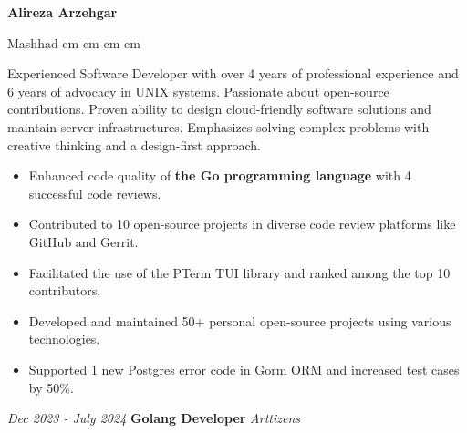 \documentclass{engineercv}
\begin{document}
\begin{center}
  \textbf{\fontsize{24 pt}{24 pt}\selectfont Alireza Arzehgar}

  \vspace{0.2 cm}

  \scriptsize
  \mbox{{\color{black}\footnotesize\faMapMarker*}\hspace*{0.13cm}Mashhad}
   cm
  \mbox{}
   cm
  \mbox{}
   cm
  \mbox{}
   cm
  \mbox{}
\end{center}


Experienced Software Developer with over 4 years of professional experience and 6 years of advocacy in UNIX systems.
Passionate about open-source contributions. Proven ability to design cloud-friendly software solutions and
maintain server infrastructures. Emphasizes solving complex problems with creative thinking
and a design-first approach.

\begin{itemize}
  \item Enhanced code quality of \textbf{the Go programming language} with 4 successful code reviews.
  \item Contributed to 10 open-source projects in diverse code review platforms like GitHub and Gerrit.
  \item Facilitated the use of the PTerm TUI library and ranked among the top 10 contributors.
  \item Developed and maintained 50+ personal open-source projects using various technologies.
  \item Supported 1 new Postgres error code in Gorm ORM and increased test cases by 50\%.
\end{itemize}

\begin{twocolentry}{\textit{Dec 2023 - July 2024}}
  \textbf{Golang Developer}
  \textit{Arttizens}
\end{twocolentry}
\end{document}
